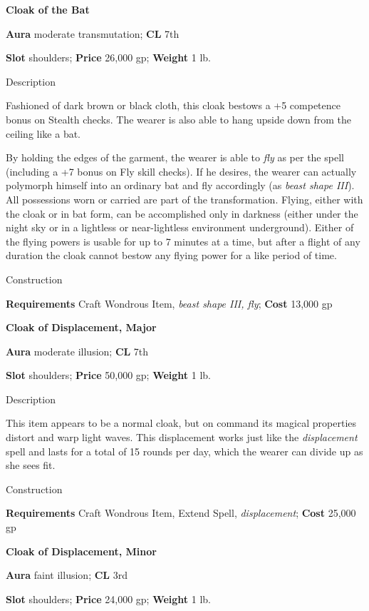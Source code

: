 \textbf{Cloak of the Bat}
				
\textbf{Aura} moderate transmutation;\textbf{ CL }7th
				
\textbf{Slot} shoulders; \textbf{Price} 26,000 gp; \textbf{Weight} 1 lb.
				
Description
				
Fashioned of dark brown or black cloth, this cloak bestows a +5 competence bonus on Stealth checks. The wearer is also able to hang upside down from the ceiling like a bat.
				
By holding the edges of the garment, the wearer is able to \textit{fly }as per the spell (including a +7 bonus on Fly skill checks). If he desires, the wearer can actually polymorph himself into an ordinary bat and fly accordingly (as \textit{beast shape III}). All possessions worn or carried are part of the transformation. Flying, either with the cloak or in bat form, can be accomplished only in darkness (either under the night sky or in a lightless or near-lightless environment underground). Either of the flying powers is usable for up to 7 minutes at a time, but after a flight of any duration the cloak cannot bestow any flying power for a like period of time. 
				
Construction
				
\textbf{Requirements} Craft Wondrous Item, \textit{beast shape III, fly}; \textbf{Cost }13,000 gp
				
\textbf{Cloak of Displacement, Major}
				
\textbf{Aura} moderate illusion;\textbf{ CL }7th
				
\textbf{Slot} shoulders; \textbf{Price} 50,000 gp; \textbf{Weight} 1 lb.
				
Description
				
This item appears to be a normal cloak, but on command its magical properties distort and warp light waves. This displacement works just like the \textit{displacement }spell and lasts for a total of 15 rounds per day, which the wearer can divide up as she sees fit. 
				
Construction
				
\textbf{Requirements} Craft Wondrous Item, Extend Spell, \textit{displacement}; \textbf{Cost }25,000 gp
				
\textbf{Cloak of Displacement, Minor}
				
\textbf{Aura} faint illusion;\textbf{ CL }3rd
				
\textbf{Slot} shoulders; \textbf{Price} 24,000 gp; \textbf{Weight} 1 lb.
				
